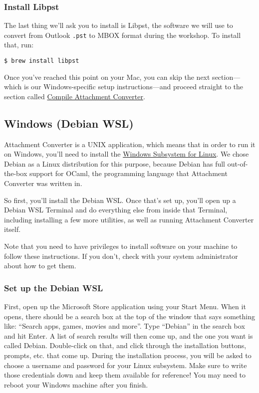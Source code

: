 \documentclass[11pt]{article}
\begin{document}
\subsubsection*{Install Libpst}
\label{sec:org05d64e0}

The last thing we'll ask you to install is Libpst, the software we
will use to convert from Outlook \texttt{.pst} to MBOX format during the
workshop.  To install that, run:

\begin{verbatim}
$ brew install libpst
\end{verbatim}

Once you've reached this point on your Mac, you can skip the next
section---which is our Windows-specific setup instructions---and
proceed straight to the section called \hyperref[org8030e04]{Compile Attachment Converter}.

\subsection*{Windows (Debian WSL) \label{org5a48eb5}}
\label{sec:orgddbd234}

Attachment Converter is a UNIX application, which means that in order
to run it on Windows, you'll need to install the \href{https://en.wikipedia.org/wiki/Windows\_Subsystem\_for\_Linux}{Windows Subsystem for
Linux}.  We chose Debian as a Linux distribution for this purpose,
because Debian has full out-of-the-box support for OCaml, the
programming language that Attachment Converter was written in.

So first, you'll install the Debian WSL.  Once that's set up, you'll
open up a Debian WSL Terminal and do everything else from inside that
Terminal, including installing a few more utilities, as well as
running Attachment Converter itself.

Note that you need to have privileges to install software on your
machine to follow these instructions.  If you don't, check with your
system administrator about how to get them.

\subsubsection*{Set up the Debian WSL}
\label{sec:org9750dcf}

First, open up the Microsoft Store application using your Start Menu.
When it opens, there should be a search box at the top of the window
that says something like: ``Search apps, games, movies and more''.  Type
``Debian'' in the search box and hit Enter.  A list of search results
will then come up, and the one you want is called Debian.
Double-click on that, and click through the installation buttons,
prompts, etc. that come up.  During the installation process, you will
be asked to choose a username and password for your Linux subsystem.
Make sure to write those credentials down and keep them available for
reference! You may need to reboot your Windows machine after you
finish.
\end{document}
